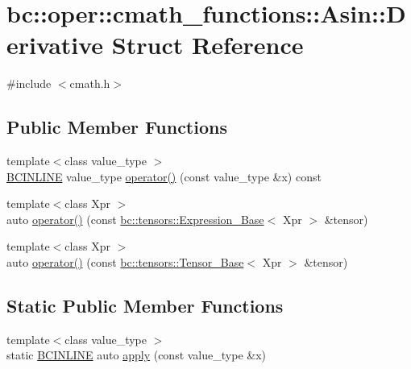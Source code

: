 \hypertarget{structbc_1_1oper_1_1cmath__functions_1_1Asin_1_1Derivative}{}\section{bc\+:\+:oper\+:\+:cmath\+\_\+functions\+:\+:Asin\+:\+:Derivative Struct Reference}
\label{structbc_1_1oper_1_1cmath__functions_1_1Asin_1_1Derivative}


{\ttfamily \#include $<$cmath.\+h$>$}

\subsection*{Public Member Functions}
\begin{DoxyCompactItemize}
\item 
{\footnotesize template$<$class value\+\_\+type $>$ }\\\hyperlink{common_8h_a6699e8b0449da5c0fafb878e59c1d4b1}{B\+C\+I\+N\+L\+I\+NE} value\+\_\+type \hyperlink{structbc_1_1oper_1_1cmath__functions_1_1Asin_1_1Derivative_a73b61a0892ca2ba608401806ef8f465e}{operator()} (const value\+\_\+type \&x) const
\item 
{\footnotesize template$<$class Xpr $>$ }\\auto \hyperlink{structbc_1_1oper_1_1cmath__functions_1_1Asin_1_1Derivative_a4b4bcc90055288853fa4d0501fe0f732}{operator()} (const \hyperlink{classbc_1_1tensors_1_1Expression__Base}{bc\+::tensors\+::\+Expression\+\_\+\+Base}$<$ Xpr $>$ \&tensor)
\item 
{\footnotesize template$<$class Xpr $>$ }\\auto \hyperlink{structbc_1_1oper_1_1cmath__functions_1_1Asin_1_1Derivative_af304ff860cc0c210b9c60e95a1d9d3d3}{operator()} (const \hyperlink{classbc_1_1tensors_1_1Tensor__Base}{bc\+::tensors\+::\+Tensor\+\_\+\+Base}$<$ Xpr $>$ \&tensor)
\end{DoxyCompactItemize}
\subsection*{Static Public Member Functions}
\begin{DoxyCompactItemize}
\item 
{\footnotesize template$<$class value\+\_\+type $>$ }\\static \hyperlink{common_8h_a6699e8b0449da5c0fafb878e59c1d4b1}{B\+C\+I\+N\+L\+I\+NE} auto \hyperlink{structbc_1_1oper_1_1cmath__functions_1_1Asin_1_1Derivative_ac30a0c646ab5f494fdc026fdffaad300}{apply} (const value\+\_\+type \&x)
\end{DoxyCompactItemize}


